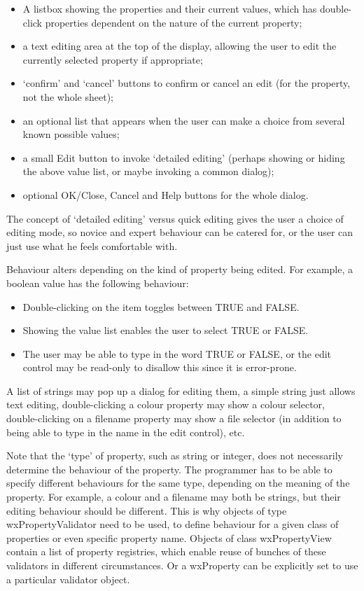\begin{itemize}\itemsep=0pt
\item A listbox showing the properties and their current values, which has double-click
properties dependent on the nature of the current property;
\item a text editing area at the top of the display, allowing the user to edit
the currently selected property if appropriate;
\item `confirm' and `cancel' buttons to confirm or cancel an edit (for the property, not the
whole sheet);
\item an optional list that appears when the user can make a choice from several known possible values;
\item a small Edit button to invoke `detailed editing' (perhaps showing or hiding the above value list, or
maybe invoking a common dialog);
\item optional OK/Close, Cancel and Help buttons for the whole dialog.
\end{itemize}

The concept of `detailed editing' versus quick editing gives the user a choice
of editing mode, so novice and expert behaviour can be catered for, or the user can just
use what he feels comfortable with.

Behaviour alters depending on the kind of property being edited. For example, a boolean value has
the following behaviour:

\begin{itemize}\itemsep=0pt
\item Double-clicking on the item toggles between TRUE and FALSE.
\item Showing the value list enables the user to select TRUE or FALSE.
\item The user may be able to type in the word TRUE or FALSE, or the edit control
may be read-only to disallow this since it is error-prone.
\end{itemize}

A list of strings may pop up a dialog for editing them, a simple string just allows text editing,
double-clicking a colour property may show a colour selector, double-clicking on a filename property may
show a file selector (in addition to being able to type in the name in the edit control), etc.

Note that the `type' of property, such as string or integer, does not
necessarily determine the behaviour of the property. The programmer has
to be able to specify different behaviours for the same type, depending
on the meaning of the property. For example, a colour and a filename may
both be strings, but their editing behaviour should be different. This
is why objects of type wxPropertyValidator need to be used, to define
behaviour for a given class of properties or even specific property
name.  Objects of class wxPropertyView contain a list of property
registries, which enable reuse of bunches of these validators in
different circumstances. Or a wxProperty can be explicitly set to use a
particular validator object. 

